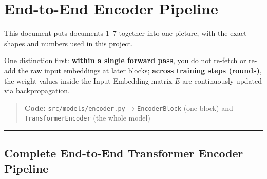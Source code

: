 \documentclass[11pt,a4paper,oneside]{report}
\begin{document}

\chapter{End-to-End Encoder Pipeline}\label{end-to-end-encoder-pipeline}

This document puts documents 1--7 together into one picture, with the exact shapes and numbers used in this project.

One distinction first: \textbf{within a single forward pass}, you do not re-fetch or re-add the raw input embeddings at later blocks; \textbf{across training steps (rounds)}, the weight values inside the Input Embedding matrix \(E\) are continuously updated via backpropagation.

\begin{quote}
\textbf{Code:} \texttt{src/\allowbreak{}models/\allowbreak{}encoder.\allowbreak{}py} → \texttt{EncoderBlock} (one block) and \texttt{TransformerEncoder} (the whole model)
\end{quote}

\begin{center}\rule{0.5\linewidth}{0.5pt}\end{center}

\section{Complete End-to-End Transformer Encoder Pipeline}\label{complete-end-to-end-transformer-encoder-pipeline}
\end{document}

